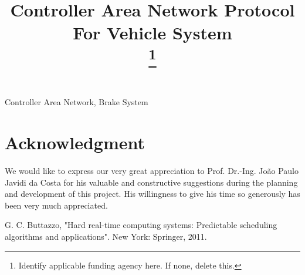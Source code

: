 \documentclass[conference]{IEEEtran}
\begin{document}
\title{Controller Area Network Protocol For Vehicle System\\
{\footnotesize }
\thanks{Identify applicable funding agency here. If none, delete this.}
}

\author{

\and
{}
\and
{}

}

\maketitle



\begin{IEEEkeywords}
Controller Area Network, Brake System
\end{IEEEkeywords}

















\section*{Acknowledgment}

We would like to express our very great appreciation to Prof. Dr.-Ing.  João Paulo Javidi da Costa  for his valuable and constructive suggestions during the planning and development of this project. His willingness to give his time so generously has been very much appreciated.


\begin{thebibliography}{00}
 G. C. Buttazzo, "Hard real-time computing systems: Predictable scheduling algorithms and applications". New York: Springer, 2011. 


\end{thebibliography}
\end{document}
